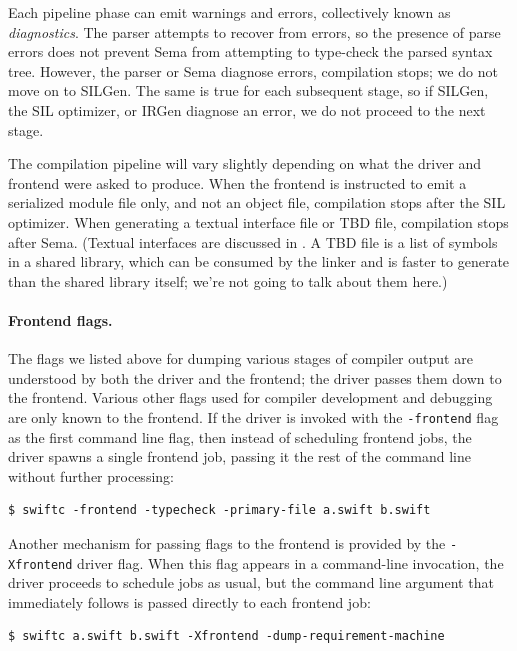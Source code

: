 \documentclass[../generics]{subfiles}
\begin{document}
Each pipeline phase can emit warnings and errors, collectively known as \emph{diagnostics}. The parser attempts to recover from errors, so the presence of parse errors does not prevent Sema from attempting to type-check the parsed syntax tree. However, the parser or Sema diagnose errors, compilation stops; we do not move on to SILGen. The same is true for each subsequent stage, so if SILGen, the SIL optimizer, or IRGen diagnose an error, we do not proceed to the next stage.

The compilation pipeline will vary slightly depending on what the driver and frontend were asked to produce. When the frontend is instructed to emit a serialized module file only, and not an object file, compilation stops after the SIL optimizer. When generating a textual interface file or TBD file, compilation stops after Sema. (Textual interfaces are discussed in . A TBD file is a list of symbols in a shared library, which can be consumed by the linker and is faster to generate than the shared library itself; we're not going to talk about them here.)

\paragraph{Frontend flags.}
The flags we listed above for dumping various stages of compiler output are understood by both the driver and the frontend; the driver passes them down to the frontend. Various other flags used for compiler development and debugging are only known to the frontend. If the driver is invoked with the \texttt{-frontend} flag as the first command line flag, then instead of scheduling frontend jobs, the driver spawns a single frontend job, passing it the rest of the command line without further processing:
\begin{Verbatim}
$ swiftc -frontend -typecheck -primary-file a.swift b.swift
\end{Verbatim}
Another mechanism for passing flags to the frontend is provided by the \texttt{-Xfrontend} driver flag. When this flag appears in a command-line invocation, the driver proceeds to schedule jobs as usual, but the command line argument that immediately follows is passed directly to each frontend job:
\begin{Verbatim}
$ swiftc a.swift b.swift -Xfrontend -dump-requirement-machine
\end{Verbatim}
\end{document}
